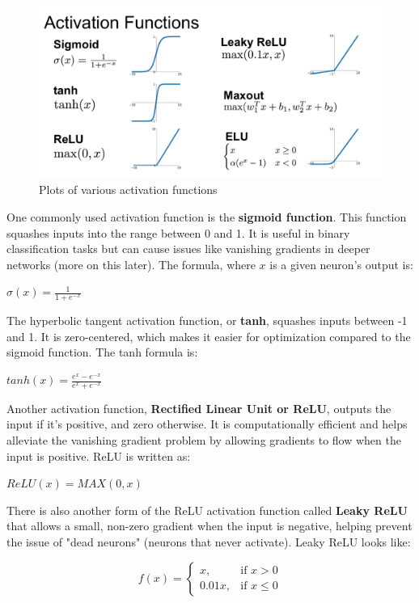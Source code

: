 \begin{figure}[H]
    \centering
    \includegraphics[width=0.75\linewidth]{dl/activationfuncs.png}
    \caption{Plots of various activation functions}
    \label{fig:activationfuncs}
\end{figure}
    \large One commonly used activation function is the \textbf{sigmoid function}. This function squashes inputs into the range between 0 and 1. It is useful in binary classification tasks but can cause issues like vanishing gradients in deeper networks (more on this later). The formula, where $x$ is a given neuron's output is:
    \begin{center}$\sigma(x) = \frac{1}{1+e^{-x}}$\end{center}
    The hyperbolic tangent activation function, or \textbf{tanh}, squashes inputs between -1 and 1. It is zero-centered, which makes it easier for optimization compared to the sigmoid function. The tanh formula is:
    \begin{center}$tanh(x) = \frac{e^x-e^{-x}}{e^x+e^{-x}}$\end{center}
    Another activation function, \textbf{Rectified Linear Unit or ReLU}, outputs the input if it's positive, and zero otherwise. It is computationally efficient and helps alleviate the vanishing gradient problem by allowing gradients to flow when the input is positive. ReLU is written as:
    \begin{center}$ReLU(x) = MAX(0,x)$\end{center}
    There is also another form of the ReLU activation function called \textbf{Leaky ReLU} that allows a small, non-zero gradient when the input is negative, helping prevent the issue of "dead neurons" (neurons that never activate). Leaky ReLU looks like:
    \begin{center}\[f(x)= 
        \begin{cases}
            x,& \text{if } x > 0\\
            0.01x,              & \text{if } x \leq 0
        \end{cases}
    \]\end{center}

